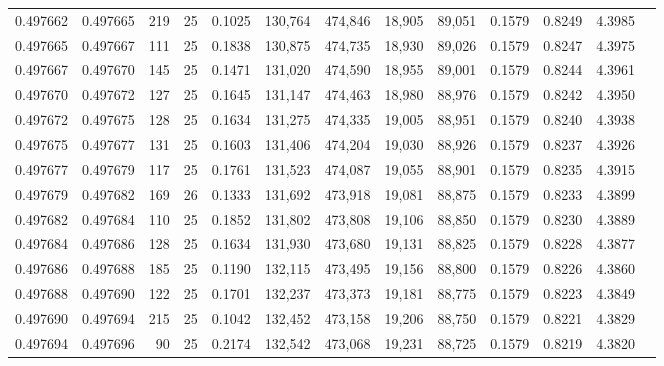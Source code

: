 \begin{tabular}{rrrrrrrrrrrrr}
0.497662 & 0.497665 & 219 &  25 &                                     0.1025 & 130,764 & 474,846 &  18,905 &  89,051 & 0.1579 & 0.8249 & 4.3985 \\
0.497665 & 0.497667 & 111 &  25 &                                     0.1838 & 130,875 & 474,735 &  18,930 &  89,026 & 0.1579 & 0.8247 & 4.3975 \\
0.497667 & 0.497670 & 145 &  25 &                                     0.1471 & 131,020 & 474,590 &  18,955 &  89,001 & 0.1579 & 0.8244 & 4.3961 \\
0.497670 & 0.497672 & 127 &  25 &                                     0.1645 & 131,147 & 474,463 &  18,980 &  88,976 & 0.1579 & 0.8242 & 4.3950 \\
0.497672 & 0.497675 & 128 &  25 &                                     0.1634 & 131,275 & 474,335 &  19,005 &  88,951 & 0.1579 & 0.8240 & 4.3938 \\
0.497675 & 0.497677 & 131 &  25 &                                     0.1603 & 131,406 & 474,204 &  19,030 &  88,926 & 0.1579 & 0.8237 & 4.3926 \\
0.497677 & 0.497679 & 117 &  25 &                                     0.1761 & 131,523 & 474,087 &  19,055 &  88,901 & 0.1579 & 0.8235 & 4.3915 \\
0.497679 & 0.497682 & 169 &  26 &                                     0.1333 & 131,692 & 473,918 &  19,081 &  88,875 & 0.1579 & 0.8233 & 4.3899 \\
0.497682 & 0.497684 & 110 &  25 &                                     0.1852 & 131,802 & 473,808 &  19,106 &  88,850 & 0.1579 & 0.8230 & 4.3889 \\
0.497684 & 0.497686 & 128 &  25 &                                     0.1634 & 131,930 & 473,680 &  19,131 &  88,825 & 0.1579 & 0.8228 & 4.3877 \\
0.497686 & 0.497688 & 185 &  25 &                                     0.1190 & 132,115 & 473,495 &  19,156 &  88,800 & 0.1579 & 0.8226 & 4.3860 \\
0.497688 & 0.497690 & 122 &  25 &                                     0.1701 & 132,237 & 473,373 &  19,181 &  88,775 & 0.1579 & 0.8223 & 4.3849 \\
0.497690 & 0.497694 & 215 &  25 &                                     0.1042 & 132,452 & 473,158 &  19,206 &  88,750 & 0.1579 & 0.8221 & 4.3829 \\
0.497694 & 0.497696 &  90 &  25 &                                     0.2174 & 132,542 & 473,068 &  19,231 &  88,725 & 0.1579 & 0.8219 & 4.3820 \\

\end{tabular}
